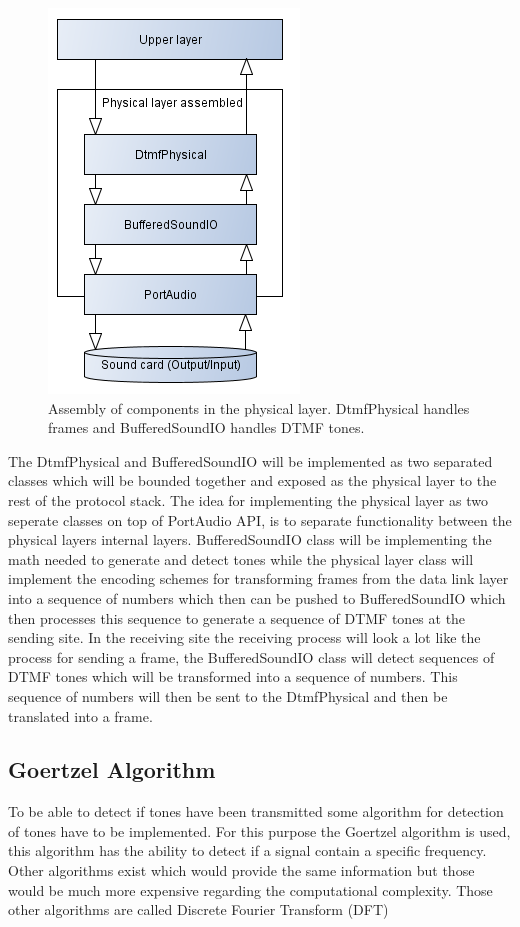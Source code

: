 	\begin{figure}[!h]
		\begin{center}
		\includegraphics[scale=0.6,trim=0 0 0 0]{content/graphics/physical/physical_4layers.png}%
		\caption{Assembly of components in the physical layer. DtmfPhysical handles frames and BufferedSoundIO handles DTMF tones.}
		\label{fig:physical_4layers}
		\end{center}
	\end{figure}
	
	The DtmfPhysical and BufferedSoundIO will be implemented as two separated classes which will be bounded together
	and exposed as the physical layer to the rest of the protocol stack. The idea for implementing the physical layer
	as two seperate classes on top of PortAudio API, is to separate functionality between the physical layers internal
	layers. BufferedSoundIO class will be implementing the math needed to generate and detect tones while the physical
	layer class will implement the encoding schemes for transforming frames from the data link layer into a sequence of
	numbers which then can be pushed to BufferedSoundIO which then processes this sequence to generate a sequence of DTMF
	tones at the sending site. In the receiving site the receiving process will look a lot like the process for sending a
	frame, the BufferedSoundIO class will detect sequences of DTMF tones which will be transformed into a sequence of
	numbers. This sequence of numbers will then be sent to the DtmfPhysical and then be translated into a frame.
	
	\subsection{Goertzel Algorithm}
	To be able to detect if tones have been transmitted some algorithm for detection of tones have to be implemented.
	For this purpose the Goertzel algorithm is used, this algorithm has the ability to detect if a signal contain a
	specific frequency. Other algorithms exist which would provide the same information but those would be
	much more expensive regarding the computational complexity. Those other algorithms are called Discrete Fourier Transform (DFT)
	
